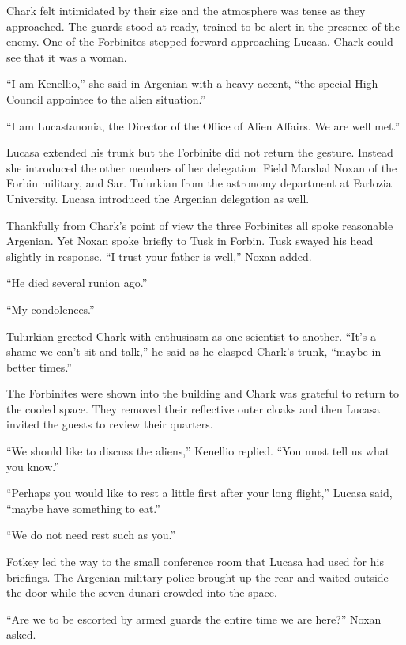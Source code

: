 Chark felt intimidated by their size and the atmosphere was tense as they approached. The guards
stood at ready, trained to be alert in the presence of the enemy. One of the Forbinites stepped
forward approaching Lucasa. Chark could see that it was a woman.

``I am Kenellio,'' she said in Argenian with a heavy accent, ``the special High Council
appointee to the alien situation.''

``I am Lucastanonia, the Director of the Office of Alien Affairs. We are well met.''

Lucasa extended his trunk but the Forbinite did not return the gesture. Instead she introduced
the other members of her delegation: Field Marshal Noxan of the Forbin military, and Sar.
Tulurkian from the astronomy department at Farlozia University. Lucasa introduced the Argenian
delegation as well.

Thankfully from Chark's point of view the three Forbinites all spoke reasonable Argenian. Yet
Noxan spoke briefly to Tusk in Forbin. Tusk swayed his head slightly in response. ``I trust your
father is well,'' Noxan added.

``He died several runion ago.''

``My condolences.''

Tulurkian greeted Chark with enthusiasm as one scientist to another. ``It's a shame we can't sit
and talk,'' he said as he clasped Chark's trunk, ``maybe in better times.''

The Forbinites were shown into the building and Chark was grateful to return to the cooled
space. They removed their reflective outer cloaks and then Lucasa invited the guests to review
their quarters.

``We should like to discuss the aliens,'' Kenellio replied. ``You must tell us what you know.''

``Perhaps you would like to rest a little first after your long flight,'' Lucasa said, ``maybe
have something to eat.''

``We do not need rest such as you.''

Fotkey led the way to the small conference room that Lucasa had used for his briefings. The
Argenian military police brought up the rear and waited outside the door while the seven dunari
crowded into the space.


``Are we to be escorted by armed guards the entire time we are here?'' Noxan asked.

